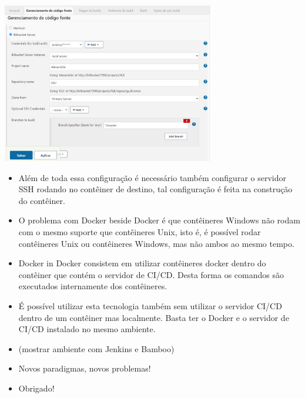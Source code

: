 \documentclass[10pt]{beamer}
\theoremstyle{remark}
\theoremstyle{definition}
\begin{document}
\begin{frame}[allowframebreaks]
	\framebreak
	
	\begin{center}
		\includegraphics[width=0.7\textwidth]{images/47.png}
	\end{center}
	
	\framebreak
	
	\begin{itemize}
	
		\item Além de toda essa configuração é necessário também configurar o servidor SSH rodando no contêiner de destino, tal configuração é feita na construção do contêiner.
	
		\item O problema com Docker beside Docker é que contêineres Windows não rodam com o mesmo suporte que contêineres Unix, isto é, é possível rodar contêineres Unix ou contêineres Windows, mas não ambos ao mesmo tempo.
		
	\end{itemize}
	
	\framebreak
	
	\begin{itemize}
	
		\item Docker in Docker consistem em utilizar contêineres docker dentro do contêiner que contém o servidor de CI/CD. Desta forma os comandos são executados internamente dos contêineres.
		
		\item É possível utilizar esta tecnologia também sem utilizar o servidor CI/CD dentro de um contêiner mas localmente. Basta ter o Docker e o servidor de CI/CD instalado no mesmo ambiente.
		
	\end{itemize}
	
	\framebreak
	
	\begin{itemize}
	
		\item (mostrar ambiente com Jenkins e Bamboo)
		
		\item Novos paradigmas, novos problemas!
		
		\item Obrigado!
		
	\end{itemize}
	
	\framebreak
	
\end{frame}
\end{document}

